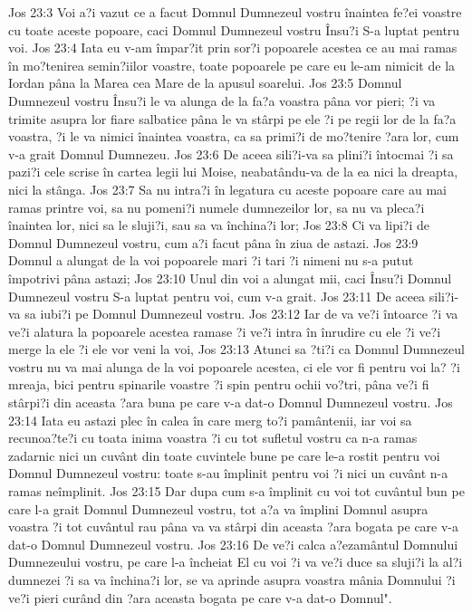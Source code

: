 Jos 23:3  Voi a?i vazut ce a facut Domnul Dumnezeul vostru înaintea fe?ei voastre cu toate aceste popoare, caci Domnul Dumnezeul vostru Însu?i S-a luptat pentru voi.
Jos 23:4  Iata eu v-am împar?it prin sor?i popoarele acestea ce au mai ramas în mo?tenirea semin?iilor voastre, toate popoarele pe care eu le-am nimicit de la Iordan pâna la Marea cea Mare de la apusul soarelui.
Jos 23:5  Domnul Dumnezeul vostru Însu?i le va alunga de la fa?a voastra pâna vor pieri; ?i va trimite asupra lor fiare salbatice pâna le va stârpi pe ele ?i pe regii lor de la fa?a voastra, ?i le va nimici înaintea voastra, ca sa primi?i de mo?tenire ?ara lor, cum v-a grait Domnul Dumnezeu.
Jos 23:6  De aceea sili?i-va sa plini?i întocmai ?i sa pazi?i cele scrise în cartea legii lui Moise, neabatându-va de la ea nici la dreapta, nici la stânga.
Jos 23:7  Sa nu intra?i în legatura cu aceste popoare care au mai ramas printre voi, sa nu pomeni?i numele dumnezeilor lor, sa nu va pleca?i înaintea lor, nici sa le sluji?i, sau sa va închina?i lor;
Jos 23:8  Ci va lipi?i de Domnul Dumnezeul vostru, cum a?i facut pâna în ziua de astazi.
Jos 23:9  Domnul a alungat de la voi popoarele mari ?i tari ?i nimeni nu s-a putut împotrivi pâna astazi;
Jos 23:10  Unul din voi a alungat mii, caci Însu?i Domnul Dumnezeul vostru S-a luptat pentru voi, cum v-a grait.
Jos 23:11  De aceea sili?i-va sa iubi?i pe Domnul Dumnezeul vostru.
Jos 23:12  Iar de va ve?i întoarce ?i va ve?i alatura la popoarele acestea ramase ?i ve?i intra în înrudire cu ele ?i ve?i merge la ele ?i ele vor veni la voi,
Jos 23:13  Atunci sa ?ti?i ca Domnul Dumnezeul vostru nu va mai alunga de la voi popoarele acestea, ci ele vor fi pentru voi la? ?i mreaja, bici pentru spinarile voastre ?i spin pentru ochii vo?tri, pâna ve?i fi stârpi?i din aceasta ?ara buna pe care v-a dat-o Domnul Dumnezeul vostru.
Jos 23:14  Iata eu astazi plec în calea în care merg to?i pamântenii, iar voi sa recunoa?te?i cu toata inima voastra ?i cu tot sufletul vostru ca n-a ramas zadarnic nici un cuvânt din toate cuvintele bune pe care le-a rostit pentru voi Domnul Dumnezeul vostru: toate s-au împlinit pentru voi ?i nici un cuvânt n-a ramas neîmplinit.
Jos 23:15  Dar dupa cum s-a împlinit cu voi tot cuvântul bun pe care l-a grait Domnul Dumnezeul vostru, tot a?a va împlini Domnul asupra voastra ?i tot cuvântul rau pâna va va stârpi din aceasta ?ara bogata pe care v-a dat-o Domnul Dumnezeul vostru.
Jos 23:16  De ve?i calca a?ezamântul Domnului Dumnezeului vostru, pe care l-a încheiat El cu voi ?i va ve?i duce sa sluji?i la al?i dumnezei ?i sa va închina?i lor, se va aprinde asupra voastra mânia Domnului ?i ve?i pieri curând din ?ara aceasta bogata pe care v-a dat-o Domnul".
